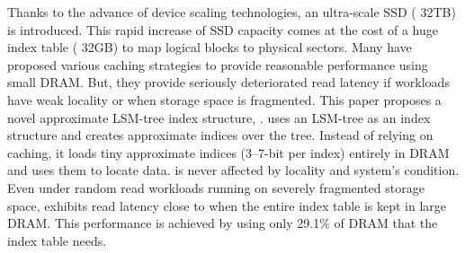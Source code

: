 Thanks to the advance of device scaling technologies, an ultra-scale SSD 
(\eg{} 32TB) is introduced. This rapid increase of SSD capacity comes
at the cost of a huge index table (\eg{} 32GB) 
to map logical blocks to physical sectors.
Many have proposed various caching strategies 
to provide reasonable performance using small DRAM.
But, they provide seriously deteriorated read latency if
workloads have weak locality or when storage space is fragmented.  
This paper proposes a novel approximate LSM-tree index structure,
\textit{\ours{}}. 
\ours{} uses an LSM-tree as an index structure
and creates approximate indices over the tree.
Instead of relying on caching, it loads tiny approximate
indices (3--7-bit per index) entirely in DRAM and uses them to locate data.
\ours{} is never affected by locality and system's condition.
Even under random read workloads running on severely fragmented storage space,
\ours{} exhibits read latency close to when the entire index table is
kept in large DRAM. This performance is achieved by using only 29.1\% of DRAM
that the index table needs.
